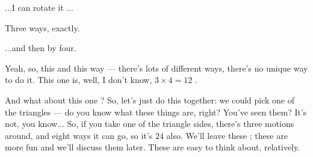\begin{student}
...I can rotate it ...
\end{student}

\begin{speech}[00:35:55 - 00:35:56]
Three ways, exactly.
\end{speech}

\begin{student}
...and then  by four.
\end{student}

\begin{speech}[00:35:58 - 00:36:06]
Yeah, so, this and this way --- there's lots of different ways, there's no unique way to do it. This one is, well, I don't know, $3 \times 4 = 12$ .
\end{speech}

\begin{content}
\end{content}

\begin{speech}[00:36:06 - 00:36:39]
And what about this one ? So, let's just do this together: we could pick one of the triangles --- do you know what these things are, right? You've seen them? It's not, you know... So, if you take one of the triangle sides, there's three motions around, and eight ways it can go, so it's $24$ also. We'll leave these ; these are more fun and we'll discuss them later. These are easy to think about, relatively.
\end{speech}

